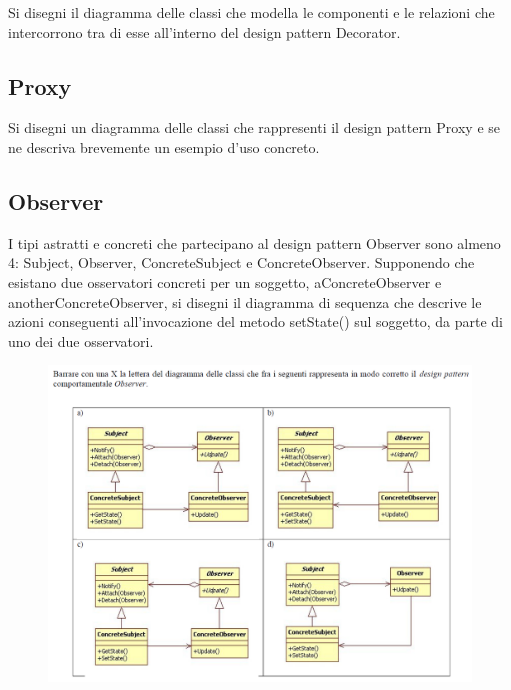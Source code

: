 Si disegni il diagramma delle classi che modella le componenti e le relazioni che intercorrono tra di esse all'interno del design pattern Decorator.

\subsection{Proxy}

Si disegni un diagramma delle classi che rappresenti il design pattern Proxy e se ne descriva brevemente un esempio
d'uso concreto.

\subsection{Observer}

I tipi astratti e concreti che partecipano al design pattern Observer sono almeno 4: Subject, Observer, ConcreteSubject e ConcreteObserver. Supponendo che esistano due osservatori concreti per un soggetto, aConcreteObserver e anotherConcreteObserver, si disegni il diagramma di sequenza che descrive le azioni conseguenti all'invocazione del metodo setState() sul soggetto, da parte di uno dei due osservatori.

\begin{figure}
\includegraphics[width=1\textwidth]{res/img/Esercizi/es-observer}
\end{figure}

